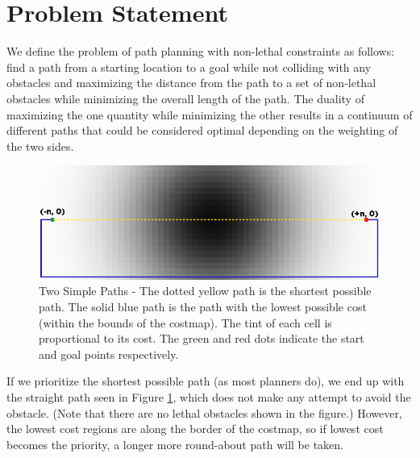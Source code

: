 \section{Problem Statement}

We define the problem of path planning with non-lethal constraints as follows: find a path from a starting location to a goal while not colliding with any obstacles and maximizing the distance from the path to a set of non-lethal obstacles while minimizing the overall length of the path. The duality of maximizing the one quantity while minimizing the other results in a continuum of different paths that could be considered optimal depending on the weighting of the two sides. 

\begin{figure}
\includegraphics[width=\columnwidth]{graphix/TwoPaths.png}
\caption{Two Simple Paths - The dotted yellow path is the shortest possible path. The solid blue path is the path with the lowest possible cost (within the bounds of the costmap). The tint of each cell is proportional to its cost. The green and red dots indicate the start and goal points respectively. }
\label{fig:twopaths}
\end{figure}

If we prioritize the shortest possible path (as most planners do), we end up with the straight path seen in Figure \ref{fig:twopaths}, which does not make any attempt to avoid the obstacle. (Note that there are no lethal obstacles shown in the figure.) However, the lowest cost regions are along the border of the costmap, so if lowest cost becomes the priority, a longer more round-about path will be taken. 

